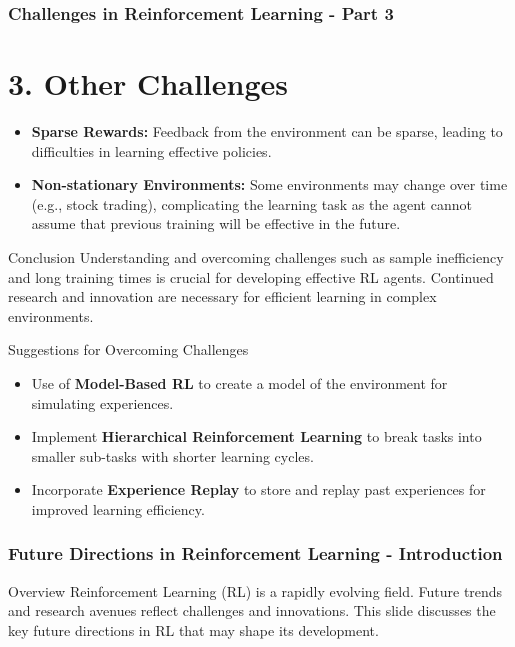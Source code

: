 \documentclass[aspectratio=169]{beamer}
\begin{document}
\begin{frame}[fragile]
    \frametitle{Challenges in Reinforcement Learning - Part 3}
    \section*{3. Other Challenges}
    \begin{itemize}
        \item \textbf{Sparse Rewards:} Feedback from the environment can be sparse, leading to difficulties in learning effective policies.
        \item \textbf{Non-stationary Environments:} Some environments may change over time (e.g., stock trading), complicating the learning task as the agent cannot assume that previous training will be effective in the future.
    \end{itemize}

    \begin{block}{Conclusion}
        Understanding and overcoming challenges such as sample inefficiency and long training times is crucial for developing effective RL agents. Continued research and innovation are necessary for efficient learning in complex environments.
    \end{block}

    \begin{block}{Suggestions for Overcoming Challenges}
        \begin{itemize}
            \item Use of \textbf{Model-Based RL} to create a model of the environment for simulating experiences.
            \item Implement \textbf{Hierarchical Reinforcement Learning} to break tasks into smaller sub-tasks with shorter learning cycles.
            \item Incorporate \textbf{Experience Replay} to store and replay past experiences for improved learning efficiency.
        \end{itemize}
    \end{block}
\end{frame}

\begin{frame}[fragile]
    \frametitle{Future Directions in Reinforcement Learning - Introduction}
    \begin{block}{Overview}
        Reinforcement Learning (RL) is a rapidly evolving field. Future trends and research avenues reflect challenges and innovations. This slide discusses the key future directions in RL that may shape its development.
    \end{block}
\end{frame}
\end{document}
